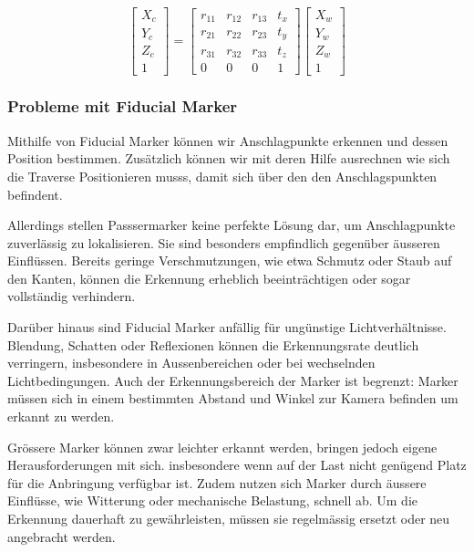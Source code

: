 \[
\begin{bmatrix}
X_c \\ 
Y_c \\ 
Z_c \\ 
1
\end{bmatrix}
=
\begin{bmatrix}
r_{11} & r_{12} & r_{13} & t_x \\
r_{21} & r_{22} & r_{23} & t_y \\
r_{31} & r_{32} & r_{33} & t_z \\
0 & 0 & 0 & 1
\end{bmatrix}
\begin{bmatrix}
X_w \\ 
Y_w \\ 
Z_w \\ 
1
\end{bmatrix}
\]

\subsubsection{Probleme mit Fiducial Marker}
Mithilfe von Fiducial Marker können wir Anschlagpunkte erkennen und dessen Position bestimmen.
Zusätzlich können wir mit deren Hilfe ausrechnen wie sich die Traverse Positionieren musss, damit
sich über den den Anschlagspunkten befindent.

Allerdings stellen Passsermarker keine perfekte Lösung dar, um Anschlagpunkte zuverlässig zu lokalisieren. 
Sie sind besonders empfindlich gegenüber äusseren Einflüssen. Bereits geringe Verschmutzungen, 
wie etwa Schmutz oder Staub auf den Kanten, können die Erkennung erheblich beeinträchtigen 
oder sogar vollständig verhindern.

Darüber hinaus sind Fiducial Marker anfällig für ungünstige Lichtverhältnisse. Blendung, Schatten 
oder Reflexionen können die Erkennungsrate deutlich verringern, insbesondere in Aussenbereichen 
oder bei wechselnden Lichtbedingungen. Auch der Erkennungsbereich der Marker ist begrenzt: Marker 
müssen sich in einem bestimmten Abstand und Winkel zur Kamera befinden um erkannt zu werden.

Grössere Marker können zwar leichter erkannt werden, bringen jedoch eigene Herausforderungen mit sich. 
insbesondere wenn auf der Last nicht genügend Platz für die Anbringung verfügbar ist. Zudem nutzen 
sich Marker durch äussere Einflüsse, wie Witterung oder mechanische Belastung, schnell ab. Um die 
Erkennung dauerhaft zu gewährleisten, müssen sie regelmässig ersetzt oder neu angebracht werden.



